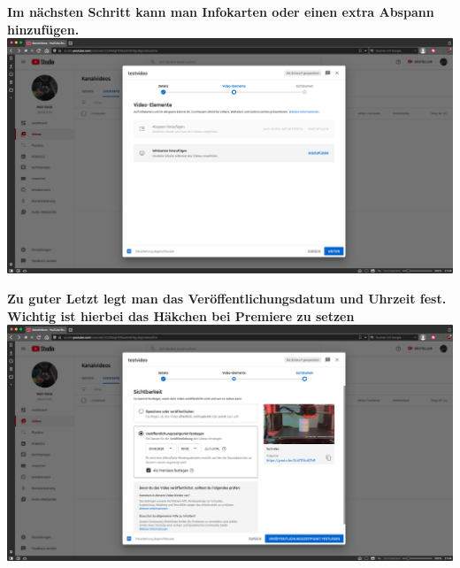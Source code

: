 \newpage
\begin{center}
  \textbf{Im nächsten Schritt kann man Infokarten oder einen extra Abspann hinzufügen.} \\
  {\vspace{0.3cm}}
  \includegraphics[width=\textwidth]{./pictures/premiere3.png}
\end{center}


\begin{center}
  \textbf{Zu guter Letzt legt man das Veröffentlichungsdatum und Uhrzeit fest. } \\
  \textbf{Wichtig ist hierbei das Häkchen bei Premiere zu setzen} \\
  {\vspace{0.3cm}}
  \includegraphics[width=\textwidth]{./pictures/premiere4.png}
\end{center}


